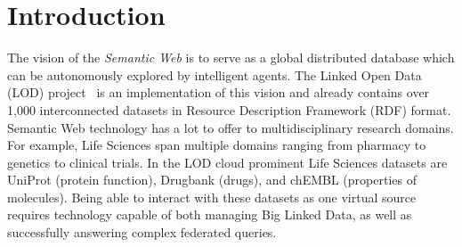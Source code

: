 \documentclass[twocolumn]{bmcart}%
\begin{document}
\begin{frontmatter}
\begin{fmbox}
\begin{abstractbox}
\begin{keyword}
\end{keyword}


\end{abstractbox}
%
\end{fmbox}%

\end{frontmatter}





\section{Introduction}
%


The vision of the \emph{Semantic Web} is to serve as a global distributed database which can be autonomously explored by intelligent agents. The Linked Open Data (LOD) project~\cite{bizer2007interlinking} is an implementation of this vision and already contains over 1,000 interconnected datasets in Resource Description Framework (RDF) format. 
Semantic Web technology has a lot to offer to multidisciplinary research domains.
For example, Life Sciences span multiple domains ranging from pharmacy to genetics to clinical trials. In the LOD cloud prominent Life Sciences datasets are 
UniProt (protein function), Drugbank (drugs), and chEMBL (properties of molecules).
Being able to interact with these datasets as one virtual source requires technology capable of both managing Big Linked Data, as well as successfully answering complex federated queries.
\end{document}
